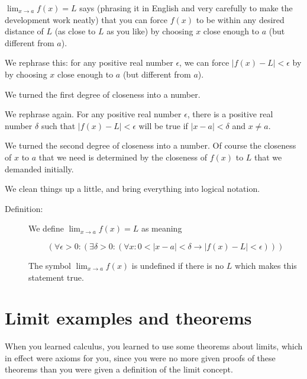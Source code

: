 \documentclass[12pt]{article}
\begin{document}
$\lim_{x \rightarrow a}f(x) = L$ says (phrasing it in English and very carefully to make the development work neatly)
that you can force $f(x)$ to be within any desired distance of $L$ (as close to $L$ as you like) by choosing $x$ close enough to $a$ (but different from $a$).

We rephrase this:  for any positive real number $\epsilon$, we can force $|f(x)-L|<\epsilon$ by by choosing $x$ close enough to $a$ (but different from $a$).

We turned the first degree of closeness into a number.

We rephrase again.  For any positive real number $\epsilon$, there is a positive real number $\delta$ such that $|f(x)-L|<\epsilon$ will be true if $|x-a|<\delta$ and $x \neq a$.

We turned the second degree of closeness into a number.  Of course the closeness of $x$ to $a$ that we need is determined by the closeness of $f(x)$ to $L$ that we demanded initially.

We clean things up a little, and bring everything into logical notation.

\begin{description}

\item[Definition:]  We define $\lim_{x \rightarrow a}f(x) = L$ as meaning

$$(\forall \epsilon>0:(\exists \delta >0:(\forall x:0<|x-a|<\delta \rightarrow |f(x)-L|<\epsilon)))$$

The symbol $\lim_{x \rightarrow a}f(x)$ is undefined if there is no $L$ which makes this statement true.

\end{description}

\newpage

\section{Limit examples and theorems}

When you learned calculus, you learned to use some theorems about limits, which in effect were axioms for you, since you were no more given proofs of these theorems than you were given a definition of the limit concept.
\end{document}
